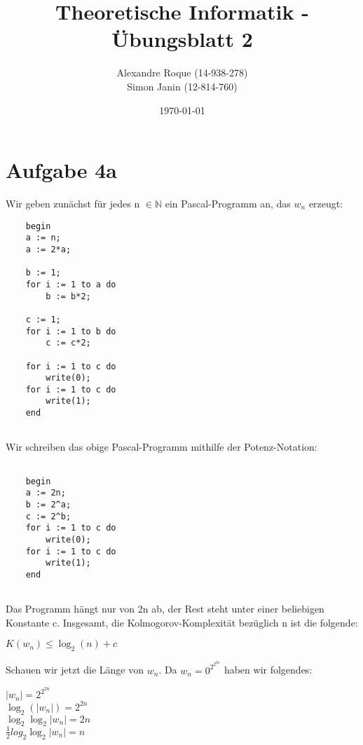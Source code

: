 \documentclass{article}
\title{Theoretische Informatik - Übungsblatt 2}
\author{Alexandre Roque (14-938-278)\\Simon Janin (12-814-760)}
\date{\today}
\begin{document}
    \maketitle
    
    \section*{Aufgabe 4a}
    
    Wir geben zunächst für jedes n $\in \mathbb{N}$  ein Pascal-Programm an, das $w_{n}$ erzeugt:
    
    \lstset{language=Pascal}
    \begin{lstlisting}
    begin
    a := n;
    a := 2*a;
    
    b := 1;
    for i := 1 to a do
    	b := b*2;
    	
    c := 1;
    for i := 1 to b do 
    	c := c*2;
    	
    for i := 1 to c do
    	write(0);
    for i := 1 to c do
    	write(1);	 		
    end
    	
    \end{lstlisting}
    
    \par
    \noindent
    Wir schreiben das obige Pascal-Programm mithilfe der Potenz-Notation:     \lstset{language=Pascal}
    \begin{lstlisting}
    	
	begin
	a := 2n;
	b := 2^a;
	c := 2^b;
	for i := 1 to c do 
		write(0);
	for i := 1 to c do
		write(1);
	end  	
    	
    \end{lstlisting}
    
    \par
    
    Das Programm hängt nur von 2n ab, der Rest steht unter einer beliebigen Konstante c.
    Insgesamt, die Kolmogorov-Komplexität bezüglich n ist die folgende:
    
    \par
    
    \begin{center}
    	$K(w_{n}) \le \log_{2}(n)+ c$
    \end{center}
    
    \par
    
    Schauen wir jetzt die Länge von $w_{n}$. Da $w_{n} = 0^{2^{2^{2n}}}$ haben wir folgendes: 
    
    \begin{center}
    $|w_{n}| = 2^{2^{2n}}$ \\
    $\log_{2}(|w_{n}|) = 2^{2n}$ \\
    $\log_{2} \log_{2} |w_{n}|= 2n$ \\
    $\frac{1}{2} log_{2} \log_{2} |w_{n}|= n$
    \end{center}
    
\end{document}
